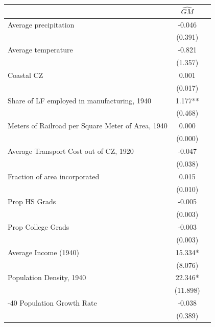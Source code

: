  \begin{tabular}{l*{2}{c}} \toprule
                &\multicolumn{1}{c}{$\widehat{GM}$}\\
\midrule
Average precipitation&   -0.046   \\
                &  (0.391)   \\
\addlinespace
Average temperature&   -0.821   \\
                &  (1.357)   \\
\addlinespace
Coastal CZ      &    0.001   \\
                &  (0.017)   \\
\addlinespace
Share of LF employed in manufacturing, 1940&    1.177** \\
                &  (0.468)   \\
\addlinespace
Meters of Railroad per Square Meter of Area, 1940&    0.000   \\
                &  (0.000)   \\
\addlinespace
Average Transport Cost out of CZ, 1920&   -0.047   \\
                &  (0.038)   \\
\addlinespace
Fraction of area incorporated&    0.015   \\
                &  (0.010)   \\
\addlinespace
Prop HS Grads   &   -0.005   \\
                &  (0.003)   \\
\addlinespace
Prop College Grads&   -0.003   \\
                &  (0.003)   \\
\addlinespace
Average Income (1940)&   15.334*  \\
                &  (8.076)   \\
\addlinespace
Population Density, 1940&   22.346*  \\
                & (11.898)   \\
\addlinespace
1930-40 Population Growth Rate&   -0.038   \\
                &  (0.389)   \\
       \bottomrule \end{tabular}
